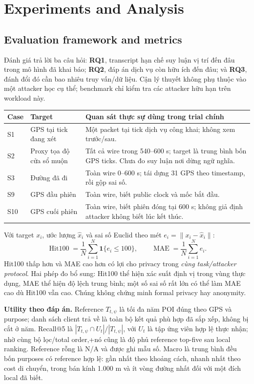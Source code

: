 \section{Experiments and Analysis}
\subsection{Evaluation framework and metrics}
Đánh giá trả lời ba câu hỏi: \textbf{RQ1}, transcript hạn chế suy luận vị trí đến đâu trong mô hình đã khai báo;
\textbf{RQ2}, đáp án dịch vụ còn hữu ích đến đâu; và \textbf{RQ3}, đánh đổi đó cần bao nhiêu truy vấn/dữ liệu.
Cận lý thuyết không phụ thuộc vào một attacker học cụ thể; benchmark chỉ kiểm tra các attacker hữu hạn trên workload này.

\begin{tabularx}{\linewidth}{@{}P{.8cm}P{4.1cm}Y@{}}\toprule
\textbf{Case} & \textbf{Target} & \textbf{Quan sát thực sự dùng trong trial chính}\\\midrule
S1 & GPS tại tick đang xét & Một packet tại tick dịch vụ công khai; không xem trước/sau.\\
S2 & Proxy tọa độ cửa sổ muộn & Tất cả wire trong 540--600 s; target là trung bình bốn GPS ticks. Chưa đo suy luận nơi dừng ngữ nghĩa.\\
S3 & Đường đã đi & Toàn wire 0--600 s; tái dựng 31 GPS theo timestamp, rồi gộp sai số.\\
S9 & GPS đầu phiên & Toàn wire, biết public clock và mốc bắt đầu.\\
S10 & GPS cuối phiên & Toàn wire, biết phiên đóng tại 600 s; không giả định attacker không biết lúc kết thúc.\\\bottomrule
\end{tabularx}

Với target $x_i$, ước lượng $\hat x_i$ và sai số Euclid theo mét $e_i=\|x_i-\hat x_i\|$:
\[
\operatorname{Hit100}=\frac1N\sum_{i=1}^N\mathbf1\{e_i\le100\},\qquad
\operatorname{MAE}=\frac1N\sum_{i=1}^Ne_i.
\]
Hit100 thấp hơn và MAE cao hơn có lợi cho privacy trong \emph{cùng task/attacker protocol}. Hai phép đo bổ sung:
Hit100 thể hiện xác suất định vị trong vùng thực dụng, MAE thể hiện độ lệch trung bình; một số sai số rất lớn
có thể làm MAE cao dù Hit100 vẫn cao. Chúng không chứng minh formal privacy hay anonymity.

\textbf{Utility theo đáp án.} Reference $T_{t,\psi}$ là tối đa năm POI đúng theo GPS và purpose; danh sách client
trả về là toàn bộ kết quả phù hợp đã sắp xếp, không bị cắt ở năm. Recall@5 là
$|T_{t,\psi}\cap U_t|/|T_{t,\psi}|$, với $U_t$ là tập ứng viên hợp lệ thực nhận; nhờ cùng bộ lọc/total order,+nó cũng là độ phủ reference top-five sau local ranking. Reference rỗng là N/A và được ghi mẫu số.
Macro là trung bình đều bốn purposes có reference hợp lệ: gần nhất theo khoảng cách, nhanh nhất theo cost
di chuyển, trong bán kính 1.000 m và ít vòng đường nhất đối với một đích local đã biết.

